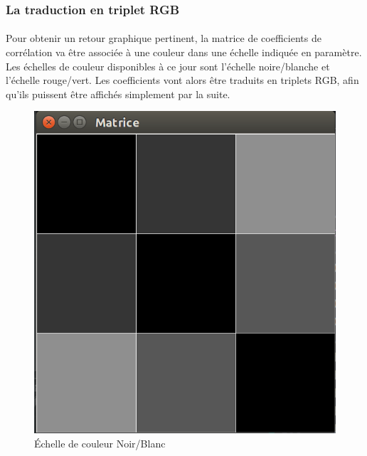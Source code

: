 \subsubsection{La traduction en triplet RGB}
\paragraph{}
Pour obtenir un retour graphique pertinent, la matrice de coefficients de corrélation va être associée à une couleur dans une échelle indiquée en paramètre. Les échelles de couleur disponibles à ce jour sont l'échelle noire/blanche et l'échelle rouge/vert. Les coefficients vont alors être traduits en triplets RGB, afin qu'ils puissent être affichés simplement par la suite.
\begin{figure}[H]
    \centering
    \includegraphics[scale=0.3]{assets/captureBW.png}
    \caption{Échelle de couleur Noir/Blanc}
    \label{bw scale}
\end{figure}

